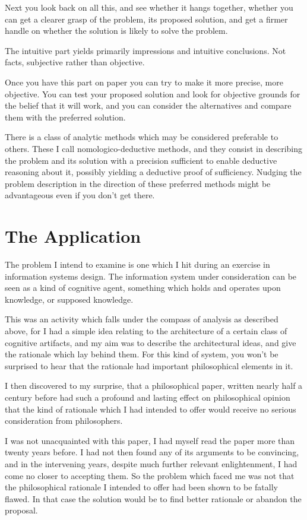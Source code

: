 Next you look back on all this, and see whether it hangs together, whether you can get a clearer grasp of the problem, its proposed solution, and get a firmer handle on whether the solution is likely to solve the problem.

The intuitive part yields primarily impressions and intuitive conclusions.
Not facts, subjective rather than objective.

Once you have this part on paper you can try to make it more precise, more objective.
You can test your proposed solution and look for objective grounds for the belief that it will work, and you can consider the alternatives and compare them with the preferred solution.

There is a class of analytic methods which may be considered preferable to others.
These I call nomologico-deductive methods, and they consist in describing the problem and its solution with a precision sufficient to enable deductive reasoning about it, possibly yielding a deductive proof of sufficiency.
Nudging the problem description in the direction of these preferred methods might be advantageous even if you don't get there.

\section{The Application}

The problem I intend to examine is one which I hit during an exercise in information systems design.
The information system under consideration can be seen as a kind of cognitive agent, something which holds and operates upon knowledge, or supposed knowledge.

This was an activity which falls under the compass of analysis as described above, for I had a simple idea relating to the architecture of a certain class of cognitive artifacts, and my aim was to describe the architectural ideas, and give the rationale which lay behind them.
For this kind of system, you won't be surprised to hear that the rationale had important philosophical elements in it.

I then discovered to my surprise, that a philosophical paper, written nearly half a century before had such a profound and lasting effect on philosophical opinion that the kind of rationale which I had intended to offer would receive no serious consideration from philosophers.

I was not unacquainted with this paper, I had myself read the paper more than twenty years before.
I had not then found any of its arguments to be convincing, and in the intervening years, despite much further relevant enlightenment, I had come no closer to accepting them.
So the problem which faced me was not that the philosophical rationale I intended to offer had been shown to be fatally flawed.
In that case the solution would be to find better rationale or abandon the proposal.

